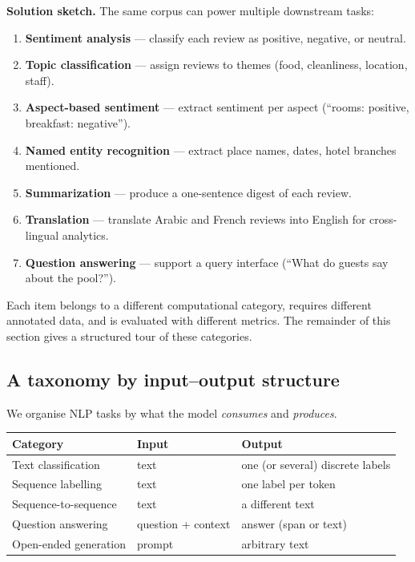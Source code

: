 \documentclass[12pt,a4paper]{report}
\theoremstyle{definition}
\theoremstyle{remark}
\begin{document}
\textbf{Solution sketch.} The same corpus can power multiple downstream tasks:
\begin{enumerate}
    \item \textbf{Sentiment analysis} --- classify each review as positive, negative, or neutral.
    \item \textbf{Topic classification} --- assign reviews to themes (food, cleanliness, location, staff).
    \item \textbf{Aspect-based sentiment} --- extract sentiment per aspect (``rooms: positive, breakfast: negative'').
    \item \textbf{Named entity recognition} --- extract place names, dates, hotel branches mentioned.
    \item \textbf{Summarization} --- produce a one-sentence digest of each review.
    \item \textbf{Translation} --- translate Arabic and French reviews into English for cross-lingual analytics.
    \item \textbf{Question answering} --- support a query interface (``What do guests say about the pool?'').
\end{enumerate}
Each item belongs to a different computational category, requires different annotated data, and is evaluated with different metrics. The remainder of this section gives a structured tour of these categories.

\subsection{A taxonomy by input--output structure}

We organise NLP tasks by what the model \emph{consumes} and \emph{produces}.

\begin{center}
\begin{tabular}{|l|l|l|}
\hline
\textbf{Category} & \textbf{Input} & \textbf{Output} \\
\hline
Text classification & text & one (or several) discrete labels \\
Sequence labelling & text & one label per token \\
Sequence-to-sequence & text & a different text \\
Question answering & question + context & answer (span or text) \\
Open-ended generation & prompt & arbitrary text \\
\hline
\end{tabular}
\end{center}
\end{document}
